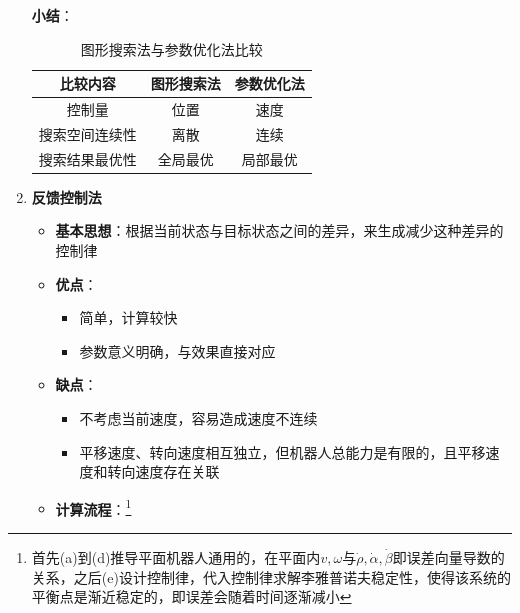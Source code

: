 \documentclass[../main.tex]{subfiles}
\begin{document}
\begin{enumerate}
\begin{itemize}
                        \end{itemize}
                    \textbf{小结}：
                    \begin{table}[htbp]
                        \centering
                        \caption{图形搜索法与参数优化法比较}
                        \begin{tabular}{ccc}
                        \toprule
                        \textbf{比较内容} & \textbf{图形搜索法} & \textbf{参数优化法} \\
                        \midrule
                        控制量 & 位置 & 速度 \\
                        搜索空间连续性 & 离散 & 连续 \\
                        搜索结果最优性 & 全局最优 & 局部最优 \\
                        \bottomrule
                        \end{tabular}
                    \end{table}
                    \item \textbf{反馈控制法}\label{method:feedback}
                        \begin{itemize}
                            \item \textbf{基本思想}：根据当前状态与目标状态之间的差异，来生成减少这种差异的控制律
                            \item \textbf{优点}：
                                \begin{itemize}
                                    \item 简单，计算较快
                                    \item 参数意义明确，与效果直接对应
                                \end{itemize}
                            \item \textbf{缺点}：
                                \begin{itemize}
                                    \item 不考虑当前速度，容易造成速度不连续
                                    \item 平移速度、转向速度相互独立，但机器人总能力是有限的，且平移速度和转向速度存在关联
                                \end{itemize}
                            \item \textbf{计算流程}：\footnote{首先(a)到(d)推导平面机器人通用的，在平面内$v,\omega$与$\dot{\rho},\dot{\alpha},\dot{\beta}$即误差向量导数的关系，之后(e)设计控制律，代入控制律求解李雅普诺夫稳定性，使得该系统的平衡点是渐近稳定的，即误差会随着时间逐渐减小}

\end{itemize}
\end{enumerate}
\end{document}
